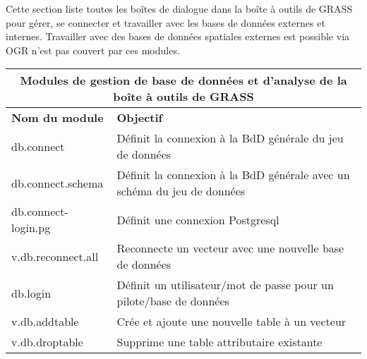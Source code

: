 Cette section liste toutes les boîtes de dialogue dans la boîte à outils de GRASS pour gérer, se connecter et travailler avec les bases de données externes et internes. Travailler avec des bases de données spatiales externes est possible via OGR n'est pas couvert par ces modules.

\begin{table}[H]
\centering
 \begin{tabular}{|p{4cm}|p{10cm}|}
\hline \multicolumn{2}{|c|}{\textbf{Modules de gestion de base de données et d'analyse de la boîte à outils de GRASS}} \\
  \hline \textbf{Nom du module} & \textbf{Objectif} \\
  \hline db.connect & Définit la connexion à la BdD générale du jeu de données \\
  \hline db.connect.schema & Définit la connexion à la BdD générale avec un schéma du jeu de données\\
  \hline db.connect-login.pg & Définit une connexion Postgresql \\    
  \hline v.db.reconnect.all & Reconnecte un vecteur avec une nouvelle base de données\\
  \hline db.login & Définit un utilisateur/mot de passe pour un pilote/base de données\\
  \hline v.db.addtable & Crée et ajoute une nouvelle table à un vecteur\\
  \hline v.db.droptable & Supprime une table attributaire existante \\

\end{tabular}
\end{table}
